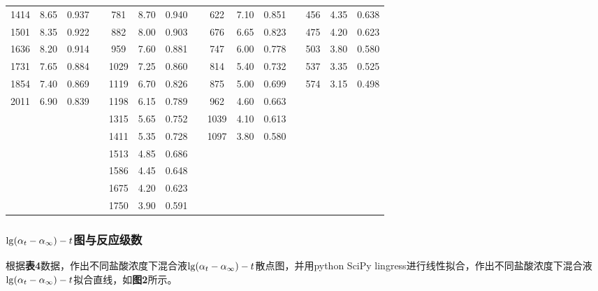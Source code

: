 \documentclass[12pt]{article}
\begin{document}
\begin{table}[h]
\begin{tabular}{ccccccccccccccc}
	1414 & 8.65  & 0.937 &  & 781  & 8.70  & 0.940 &  & 622  & 7.10  & 0.851 &  & 456 & 4.35 & 0.638 \\
	1501 & 8.35  & 0.922 &  & 882  & 8.00  & 0.903 &  & 676  & 6.65  & 0.823 &  & 475 & 4.20 & 0.623 \\
	1636 & 8.20  & 0.914 &  & 959  & 7.60  & 0.881 &  & 747  & 6.00  & 0.778 &  & 503 & 3.80 & 0.580 \\
	1731 & 7.65  & 0.884 &  & 1029 & 7.25  & 0.860 &  & 814  & 5.40  & 0.732 &  & 537 & 3.35 & 0.525 \\
	1854 & 7.40  & 0.869 &  & 1119 & 6.70  & 0.826 &  & 875  & 5.00  & 0.699 &  & 574 & 3.15 & 0.498 \\
	2011 & 6.90  & 0.839 &  & 1198 & 6.15  & 0.789 &  & 962  & 4.60  & 0.663 &  &     &      &       \\
	&       &       &  & 1315 & 5.65  & 0.752 &  & 1039 & 4.10  & 0.613 &  &     &      &       \\
	&       &       &  & 1411 & 5.35  & 0.728 &  & 1097 & 3.80  & 0.580 &  &     &      &       \\
	&       &       &  & 1513 & 4.85  & 0.686 &  &      &       &       &  &     &      &       \\
	&       &       &  & 1586 & 4.45  & 0.648 &  &      &       &       &  &     &      &       \\
	&       &       &  & 1675 & 4.20  & 0.623 &  &      &       &       &  &     &      &       \\
	&       &       &  & 1750 & 3.90  & 0.591 &  &      &       &       &  &     &      &      \\
		
		
		\bottomrule
	\end{tabular}
\end{table}
\par 

\subsubsection{${\rm lg}(\alpha_{t}-\alpha_{\infty})-t$图与反应级数}
根据\textbf{表4}数据，作出不同盐酸浓度下混合液${\rm lg}(\alpha_{t}-\alpha_{\infty})-t$散点图，并用python SciPy lingress进行线性拟合，作出不同盐酸浓度下混合液${\rm lg}(\alpha_{t}-\alpha_{\infty})-t$拟合直线，如\textbf{图2}所示。
\end{document}

